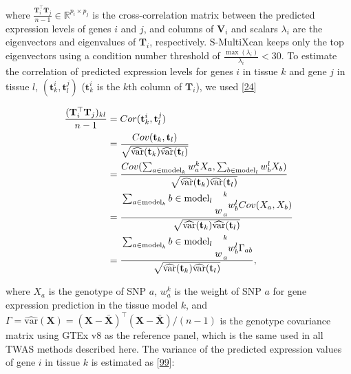 \documentclass[
]{article}
\begin{document}
where \(\frac{\mathbf{T}_{i}^{\top} \mathbf{T}_{j}}{n-1} \in \mathbb{R}^{p_i \times p_j}\) is the cross-correlation matrix between the predicted expression levels of genes \(i\) and \(j\),
and columns of \(\mathbf{V}_{i}\) and scalars \(\lambda_i\) are the eigenvectors and eigenvalues of \(\mathbf{T}_{i}\), respectively.
S-MultiXcan keeps only the top eigenvectors using a condition number threshold of \(\frac{\max(\lambda_i)}{\lambda_i} < 30\).
To estimate the correlation of predicted expression levels for genes \(i\) in tissue \(k\) and gene \(j\) in tissue \(l\), \((\mathbf{t}_k^i, \mathbf{t}_l^j)\) (\(\mathbf{t}_k^i\) is the \(k\)th column of \(\mathbf{T}_{i}\)), we used {[}\protect\hyperlink{ref-1FFzCXo1s}{24}{]}

\begin{equation}
\begin{split}
\frac{(\mathbf{T}_{i}^{\top} \mathbf{T}_{j})_{kl}}{n-1} & = Cor(\mathbf{t}_k^i, \mathbf{t}_l^j) \\
 & = \frac{ Cov(\mathbf{t}_k, \mathbf{t}_l) } { \sqrt{\widehat{\mathrm{var}}(\mathbf{t}_k) \widehat{\mathrm{var}}(\mathbf{t}_l)} } \\
 & = \frac{ Cov(\sum_{a \in \mathrm{model}_k} w_a^k X_a, \sum_{b \in \mathrm{model}_l} w_b^l X_b) }  {\sqrt{\widehat{\mathrm{var}}(\mathbf{t}_k) \widehat{\mathrm{var}}(\mathbf{t}_l)} } \\
 & = \frac{ \splitfrac{\sum_{a \in \mathrm{model}_k}{b \in \mathrm{model}_l}} w_a^k w_b^l Cov(X_a, X_b)} {\sqrt{\widehat{\mathrm{var}}(\mathbf{t}_k) \widehat{\mathrm{var}}(\mathbf{t}_l)} } \\
        & = \frac{ \splitfrac{\sum_{a \in \mathrm{model}_k}{b \in \mathrm{model}_l}} w_a^k w_b^l \Gamma_{ab}} {\sqrt{\widehat{\mathrm{var}}(\mathbf{t}_k) \widehat{\mathrm{var}}(\mathbf{t}_l)} },
\end{split}
\label{eq:reg:corr_genes}\end{equation}

where \(X_a\) is the genotype of SNP \(a\),
\(w_a^k\) is the weight of SNP \(a\) for gene expression prediction in the tissue model \(k\),
and \(\Gamma = \widehat{\mathrm{var}}(\mathbf{X}) = (\mathbf{X} - \mathbf{\bar{X}})^{\top} (\mathbf{X} - \mathbf{\bar{X}}) / (n-1)\) is the genotype covariance matrix using GTEx v8 as the reference panel, which is the same used in all TWAS methods described here.
The variance of the predicted expression values of gene \(i\) in tissue \(k\) is estimated as {[}\protect\hyperlink{ref-vLyTudUB}{99}{]}:
\end{document}

